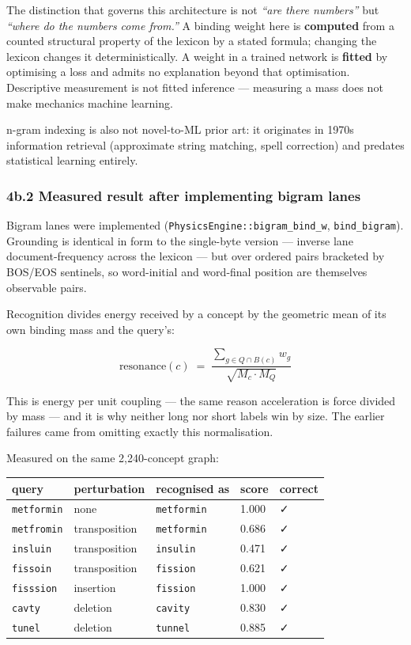 \documentclass[
  11pt,
  a4paper,
]{article}
\begin{document}
The distinction that governs this architecture is not \emph{``are there
numbers''} but \emph{``where do the numbers come from.''} A binding
weight here is \textbf{computed} from a counted structural property of
the lexicon by a stated formula; changing the lexicon changes it
deterministically. A weight in a trained network is \textbf{fitted} by
optimising a loss and admits no explanation beyond that optimisation.
Descriptive measurement is not fitted inference --- measuring a mass
does not make mechanics machine learning.

n-gram indexing is also not novel-to-ML prior art: it originates in
1970s information retrieval (approximate string matching, spell
correction) and predates statistical learning entirely.

\subsubsection{4b.2 Measured result after implementing bigram
lanes}\label{b.2-measured-result-after-implementing-bigram-lanes}

Bigram lanes were implemented (\texttt{PhysicsEngine::bigram\_bind\_w},
\texttt{bind\_bigram}). Grounding is identical in form to the
single-byte version --- inverse lane document-frequency across the
lexicon --- but over ordered pairs bracketed by BOS/EOS sentinels, so
word-initial and word-final position are themselves observable pairs.

Recognition divides energy received by a concept by the geometric mean
of its own binding mass and the query's:

\[
\text{resonance}(c) \;=\; \frac{\sum_{g \in Q \cap B(c)} w_g}{\sqrt{M_c \cdot M_Q}}
\]

This is energy per unit coupling --- the same reason acceleration is
force divided by mass --- and it is why neither long nor short labels
win by size. The earlier failures came from omitting exactly this
normalisation.

Measured on the same 2,240-concept graph:

\begin{longtable}[]{@{}lllll@{}}
\toprule\noalign{}
query & perturbation & recognised as & score & correct \\
\midrule\noalign{}
\endhead
\bottomrule\noalign{}
\endlastfoot
\texttt{metformin} & none & \texttt{metformin} & 1.000 & ✓ \\
\texttt{metfromin} & transposition & \texttt{metformin} & 0.686 & ✓ \\
\texttt{insluin} & transposition & \texttt{insulin} & 0.471 & ✓ \\
\texttt{fissoin} & transposition & \texttt{fission} & 0.621 & ✓ \\
\texttt{fisssion} & insertion & \texttt{fission} & 1.000 & ✓ \\
\texttt{cavty} & deletion & \texttt{cavity} & 0.830 & ✓ \\
\texttt{tunel} & deletion & \texttt{tunnel} & 0.885 & ✓ \\
\end{longtable}
\end{document}
